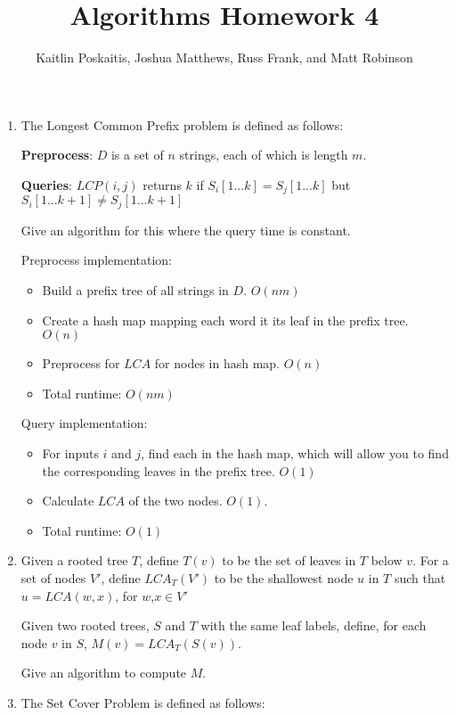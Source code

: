 \documentclass[12pt]{article}
\title{\bf Algorithms Homework 4}
\author{Kaitlin Poskaitis, Joshua Matthews, Russ Frank, and Matt Robinson}
\date{}
\begin{document}
\maketitle

\begin{enumerate}
\item The Longest Common Prefix problem is defined as follows:

    {\bf Preprocess}: $D$ is a set of $n$ strings, each of which is
        length $m$.

    {\bf Queries}: $LCP(i,j)$ returns $k$ if $S_i[1...k] = S_j[1...k]$
        but $S_i[1...k+1] \neq S_j[1...k+1]$

Give an algorithm for this where the query time is constant.

Preprocess implementation:
\begin{itemize}
    \item Build a prefix tree of all strings in $D$. $O(nm)$
    \item Create a hash map mapping each word it its leaf in the prefix tree.
        $O(n)$
    \item Preprocess for $LCA$ for nodes in hash map. $O(n)$
    \item Total runtime: $O(nm)$
\end{itemize}

Query implementation:
\begin{itemize}
    \item For inputs $i$ and $j$, find each in the hash map, which will allow
        you to find the corresponding leaves in the prefix tree. $O(1)$
    \item Calculate $LCA$ of the two nodes. $O(1)$.
    \item Total runtime: $O(1)$
\end{itemize}

\item Given a rooted tree $T$, define $T(v)$ to be the set of leaves in $T$
    below $v$. For a set of nodes $V'$, define $LCA_T(V')$ to be the shallowest
    node $u$ in $T$ such that $u = LCA(w,x)$, for $w$,$x \in V'$

    Given two rooted trees, $S$ and $T$ with the same leaf labels, define, for
    each node $v$ in $S$, $M(v) = LCA_T(S(v))$.

    Give an algorithm to compute $M$.

\item The Set Cover Problem is defined as follows:


\end{enumerate}
\end{document}
